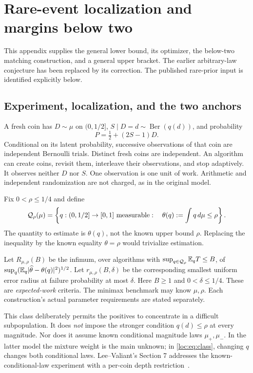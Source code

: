 \section{Rare-event localization and margins below two}\label{app:localization}
This appendix supplies the general lower bound, its optimizer, the
below-two matching construction, and a general upper bracket.
The earlier arbitrary-law conjecture has been replaced by its correction.
The published rare-prior input is identified explicitly below.

\subsection{Experiment, localization, and the two anchors}
A fresh coin has $D\sim\mu$ on $(0,1/2]$, $S\mid D=d\sim\operatorname{Ber}(q(d))$, and probability
\[
 P=\tfrac12+(2S-1)D.
\]
Conditional on its latent probability, successive observations of that coin are independent Bernoulli trials. Distinct fresh coins are independent. An algorithm can create coins, revisit them, interleave their observations, and stop adaptively. It observes neither $D$ nor $S$. One observation is one unit of work. Arithmetic and independent randomization are not charged, as in the original model.

Fix $0<\rho\le1/4$ and define
\begin{equation}\label{loc:eq:class}
 \mathcal Q_\rho(\mu)=\left\{q:(0,1/2]\to[0,1]\text{ measurable}:\quad
 \theta(q):=\int q\,d\mu\le\rho\right\}.
\end{equation}
The quantity to estimate is $\theta(q)$, not the known upper bound $\rho$. Replacing the inequality by the known equality $\theta=\rho$ would trivialize estimation.

Let $R_{\mu,\rho}(B)$ be the infimum, over algorithms with $\sup_{q\in\mathcal Q_\rho}\mathbb E_qT\le B$, of $\sup_q(\mathbb E_q|\widehat\theta-\theta(q)|^2)^{1/2}$. Let $r_{\mu,\rho}(B,\delta)$ be the corresponding smallest uniform error radius at failure probability at most $\delta$. Here $B\ge1$ and $0<\delta\le1/4$. These are \emph{expected-work} criteria. The minimax benchmark may know $\mu,\rho$. Each construction's actual parameter requirements are stated separately.

This class deliberately permits the positives to concentrate in a difficult subpopulation. It does \emph{not} impose the stronger condition $q(d)\le\rho$ at every magnitude. Nor does it assume known conditional magnitude laws $\mu_+,\mu_-$. In the latter model the mixture weight is the main unknown; in \eqref{loc:eq:class}, changing $q$ changes both conditional laws. Lee--Valiant's Section 7 addresses the known-conditional-law experiment with a per-coin depth restriction~\cite{leevaliant}.

